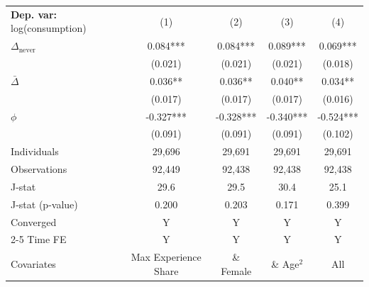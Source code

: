 \begin{tabular}{l cccc} \toprule  \textbf{Dep. var:}  log(consumption) 
                    &\multicolumn{1}{c}{(1)}   &\multicolumn{1}{c}{(2)}   &\multicolumn{1}{c}{(3)}   &\multicolumn{1}{c}{(4)}   \\

\addlinespace
$\Delta_{\text{never}}$&       0.084***&       0.084***&       0.089***&       0.069***\\
                    &     (0.021)   &     (0.021)   &     (0.021)   &     (0.018)   \\

\addlinespace
$\bar{\Delta}$      &       0.036** &       0.036** &       0.040** &       0.034** \\
                    &     (0.017)   &     (0.017)   &     (0.017)   &     (0.016)   \\

\addlinespace
$\phi$              &      -0.327***&      -0.328***&      -0.340***&      -0.524***\\
                    &     (0.091)   &     (0.091)   &     (0.091)   &     (0.102)   \\
\addlinespace
Individuals         &      29,696   &      29,691   &      29,691   &      29,691   \\
Observations        &      92,449   &      92,438   &      92,438   &      92,438   \\
J-stat              &        29.6   &        29.5   &        30.4   &        25.1   \\
J-stat (p-value)    &       0.200   &       0.203   &       0.171   &       0.399   \\
Converged           &           Y   &           Y   &           Y   &           Y   \\
\cmidrule{2-5} Time FE & Y & Y & Y & Y \\ Covariates & Max Experience Share & \& Female & \& Age$^2$ & All \\ \bottomrule \end{tabular}
